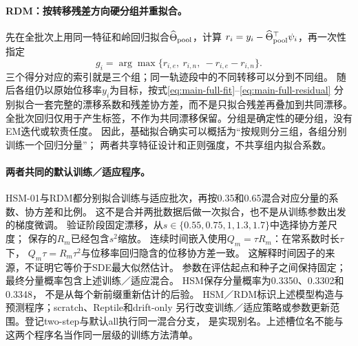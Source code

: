 \paragraph{RDM：按转移残差方向硬分组并重拟合。}
先在全批次上用同一特征和岭回归拟合$\widehat\Theta_{\rm pool}$，计算
$r_i=y_i-\widehat\Theta_{\rm pool}^{\top}\psi_i$，再一次性指定
\begin{equation}\label{eq:rdm-grouping}
 g_i=\arg\max\{r_{i,e},\ r_{i,n},\ -r_{i,e}-r_{i,n}\}.
\end{equation}
三个得分对应的索引就是三个组；同一轨迹段中的不同转移可以分到不同组。
随后各组仍以原始位移率$y_i$为目标，按式\eqref{eq:main-full-fit}--\eqref{eq:main-full-residual}
分别拟合一套完整的漂移系数和残差协方差，而不是只拟合残差再叠加到共同漂移。
全批次回归仅用于产生标签，不作为共同漂移保留。分组是确定性的硬分组，没有EM迭代或软责任度。
因此，基础拟合确实可以概括为“按规则分三组，各组分别训练一个回归分量”；
两者共享特征设计和正则强度，不共享组内拟合系数。

\paragraph{两者共同的默认训练／适应程序。}
HSM-01与RDM都分别拟合训练与适应批次，再按0.35和0.65混合对应分量的系数、协方差和比例。
这不是合并两批数据后做一次拟合，也不是从训练参数出发的梯度微调。
验证阶段固定漂移，从$s\in\{0.55,0.75,1,1.3,1.7\}$中选择协方差尺度；
保存的$R_m$已经包含$s^2$缩放。
连续时间嵌入使用$Q_m=\tau R_m$：在常系数时长$\tau$下，
$Q_m\tau=R_m\tau^2$与位移率回归隐含的位移协方差一致。
这解释时间因子的来源，不证明它等价于SDE最大似然估计。
参数在评估起点和种子之间保持固定；最终分量概率包含上述训练／适应混合。
HSM保存分量概率为0.3350、0.3302和0.3348，
不是从每个新前缀重新估计的后验。
HSM／RDM标识上述模型构造与预测程序；scratch、Reptile和drift-only
另行改变训练／适应策略或参数更新范围。登记two-step与默认all执行同一混合分支，
是实现别名。上述槽位名不能与这两个程序名当作同一层级的训练方法清单。
